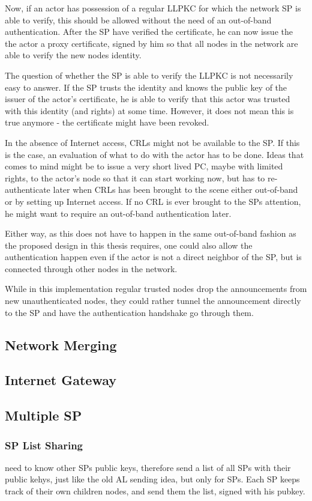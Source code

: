 Now, if an actor has possession of a regular \ac{LLPKC} for which the network
\ac{SP} is able to verify, this should be allowed without the need of an
out-of-band authentication. After the \ac{SP} have verified the certificate, he
can now issue the the actor a proxy certificate, signed by him so that all nodes
in the network are able to verify the new nodes identity.

The question of whether the \ac{SP} is able to verify the \ac{LLPKC} is not
necessarily easy to answer. If the \ac{SP} trusts the identity and knows the
public key of the issuer of the actor's certificate, he is able to verify that
this actor was trusted with this identity (and rights) at some time. However, it
does not mean this is true anymore - the certificate might have been revoked.

In the absence of Internet access, \acp{CRL} might not be available to the
\ac{SP}. If this is the case, an evaluation of what to do with the actor has to
be done. Ideas that comes to mind might be to issue a very short lived \ac{PC},
maybe with limited rights, to the actor's node so that it can start working now,
but has to re-authenticate later when \acp{CRL} has been brought to the scene
either out-of-band or by setting up Internet access. If no \ac{CRL} is ever
brought to the SPs attention, he might want to require an out-of-band
authentication later.

Either way, as this does not have to happen in the same out-of-band fashion as
the proposed design in this thesis requires, one could also allow the
authentication happen even if the actor is not a direct neighbor of the \ac{SP},
but is connected through other nodes in the network.

While in this implementation regular trusted nodes drop the announcements from
new unauthenticated nodes, they could rather tunnel the announcement directly to
the \ac{SP} and have the authentication handshake go through them.

\subsection{Network Merging}
\subsection{Internet Gateway}
\subsection{Multiple SP}
\subsubsection*{SP List Sharing}
need to know other SPs public keys, therefore send a list of all SPs with their
public kehys, just like the old AL sending idea, but only for SPs. Each SP keeps
track of their own children nodes, and send them the list, signed with his
pubkey.
